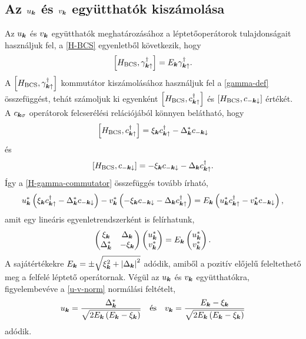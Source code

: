 \documentclass[a4paper,12pt,titlepage]{article}
\newcommand{\KK}{{\vb*{k}}}
\begin{document}
\subsection{Az $u_\KK$ és $v_\KK$ együtthatók kiszámolása}

Az $u_\KK$ és $v_\KK$ együtthatók meghatározásához a léptetőoperátorok tulajdonságait használjuk fel, a \eqref{H-BCS} egyenletből következik, hogy
\begin{equation} \label{H-gamma-commutator}
	\commutator{H_\text{BCS}}{\gamma_{\KK \uparrow}^\dagger} = E_\KK \gamma_{\KK \uparrow}^\dagger.
\end{equation}
A $\commutator{H_\text{BCS}}{\gamma_{\KK \uparrow}^\dagger}$ kommutátor kiszámolásához használjuk fel a \eqref{gamma-def} összefüggést, tehát számoljuk ki egyenként $\commutator{H_\text{BCS}}{c_{\KK \uparrow}^\dagger}$ és $\commutator{H_\text{BCS}}{c_{-\KK \downarrow}}$ értékét.  A $c_{\KK \sigma}$ operátorok felcserélési relációjából könnyen belátható, hogy
\begin{equation}
	\commutator{H_\text{BCS}}{c_{\KK \uparrow}^\dagger} = \xi_\KK c_{\KK \uparrow}^\dagger - \Delta_\KK^* c_{-\KK \downarrow}
\end{equation}
és
\begin{equation}
	\commutator{H_\text{BCS}}{c_{-\KK \downarrow}} = -\xi_\KK c_{-\KK \downarrow} - \Delta_\KK c_{\KK \uparrow}^\dagger.
\end{equation}
Így a \eqref{H-gamma-commutator} összefüggés tovább írható,
\begin{equation}
	u_\KK^* \left( \xi_\KK c_{\KK \uparrow}^\dagger - \Delta_\KK^* c_{-\KK \downarrow} \right) - v_\KK^* \left( -\xi_\KK c_{-\KK \downarrow} - \Delta_\KK c_{\KK \uparrow}^\dagger \right) = E_\KK \left( u_\KK^* c_{\KK \uparrow}^\dagger - v_\KK^* c_{-\KK \downarrow} \right),
\end{equation}
amit egy lineáris egyenletrendszerként is felírhatunk,
\begin{equation}
	\begin{pmatrix}
		\xi_\KK & \Delta_\KK \\
		\Delta_\KK^* & -\xi_\KK
	\end{pmatrix} \begin{pmatrix} u_\KK^* \\ v_\KK^* \end{pmatrix}
	= E_\KK \begin{pmatrix} u_\KK^* \\ v_\KK^* \end{pmatrix}.
\end{equation}
A sajátértékekre $E_\KK = \pm \sqrt{\xi_\KK^2 + \left| \Delta_\KK \right|^2}$ adódik, amiből a pozitív előjelű feleltethető meg a felfelé léptető operátornak.  Végül az $u_\KK$ és $v_\KK$ együtthatókra, figyelembevéve a \eqref{u-v-norm} normálási feltételt,
\begin{equation}
	u_\KK = \frac{\Delta_\KK^*}{\sqrt{2 E_\KK \left( E_\KK - \xi_\KK \right)}} ~~~ \text{és} ~~~ v_\KK = \frac{E_\KK - \xi_\KK}{\sqrt{2 E_\KK \left( E_\KK - \xi_\KK \right)}}
\end{equation}
adódik.
\end{document}
